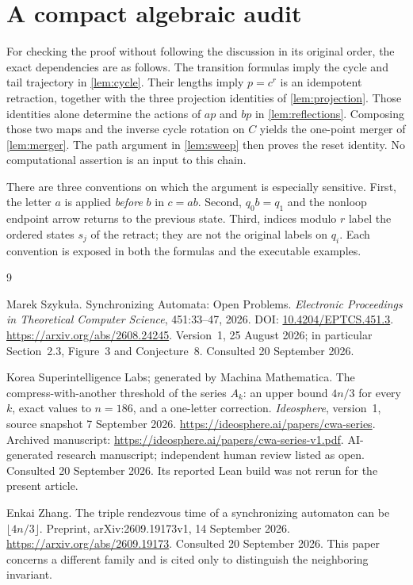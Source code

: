 \documentclass[11pt,a4paper]{article}
\numberwithin{equation}{section}
\theoremstyle{definition}
\theoremstyle{remark}
\begin{document}
\clearpage
\section{A compact algebraic audit}

For checking the proof without following the discussion in its original
order, the exact dependencies are as follows. The transition formulas imply
the cycle and tail trajectory in \cref{lem:cycle}. Their lengths imply
$p=c^r$ is an idempotent retraction, together with the three projection
identities of \cref{lem:projection}. Those identities alone determine the
actions of $ap$ and $bp$ in \cref{lem:reflections}. Composing those two
maps and the inverse cycle rotation on $C$ yields the one-point merger of
\cref{lem:merger}. The path argument in \cref{lem:sweep} then proves the
reset identity. No computational assertion is an input to this chain.

There are three conventions on which the argument is especially sensitive.
First, the letter $a$ is applied \emph{before} $b$ in $c=ab$. Second,
$q_0b=q_1$ and the nonloop endpoint arrow returns to the previous state.
Third, indices modulo $r$ label the ordered states $s_j$ of the retract;
they are not the original labels on $q_i$. Each convention is exposed in
both the formulas and the executable examples.

\begin{thebibliography}{9}

Marek Szyku\l a.
\newblock Synchronizing Automata: Open Problems.
\newblock \emph{Electronic Proceedings in Theoretical Computer Science},
451:33--47, 2026.
\newblock DOI: \href{https://doi.org/10.4204/EPTCS.451.3}{10.4204/EPTCS.451.3}.
\newblock \url{https://arxiv.org/abs/2608.24245}.
\newblock Version~1, 25 August 2026; in particular Section~2.3,
Figure~3 and Conjecture~8. Consulted 20 September 2026.

Korea Superintelligence Labs; generated by Machina Mathematica.
\newblock The compress-with-another threshold of the series $A_k$: an upper
bound $4n/3$ for every $k$, exact values to $n=186$, and a one-letter correction.
\newblock \emph{Ideosphere}, version~1, source snapshot 7 September 2026.
\newblock \url{https://ideosphere.ai/papers/cwa-series}.
\newblock Archived manuscript:
\url{https://ideosphere.ai/papers/cwa-series-v1.pdf}.
\newblock AI-generated research manuscript; independent human review listed
as open. Consulted 20 September 2026. Its reported Lean build was not rerun
for the present article.

Enkai Zhang.
\newblock The triple rendezvous time of a synchronizing automaton can be
$\lfloor4n/3\rfloor$.
\newblock Preprint, arXiv:2609.19173v1, 14 September 2026.
\newblock \url{https://arxiv.org/abs/2609.19173}.
\newblock Consulted 20 September 2026. This paper concerns a different
family and is cited only to distinguish the neighboring invariant.

\end{thebibliography}
\end{document}
